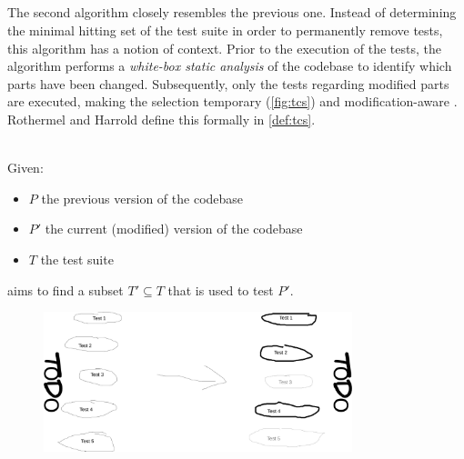 
\subsection{\tcs{}}
The second algorithm closely resembles the previous one. Instead of determining the minimal hitting set of the test suite in order to permanently remove tests, this algorithm has a notion of context. Prior to the execution of the tests, the algorithm performs a \emph{white-box static analysis} of the codebase to identify which parts have been changed. Subsequently, only the tests regarding modified parts are executed, making the selection temporary (\autoref{fig:tcs}) and modification-aware \cite{10.1002/stv.430}. Rothermel and Harrold define this formally in \autoref{def:tcs}.

\begin{definition}[\tcs{}]
\label{def:tcs}
\mbox{}\\Given:
\begin{itemize}
	\item $P$ the previous version of the codebase
	\item $P'$ the current (modified) version of the codebase
	\item $T$ the test suite
\end{itemize}

\noindent \tcs{} aims to find a subset $T' \subseteq T$ that is used to test $P'$. 
\end{definition}

\begin{figure}[htbp!]
	\centering
	\includegraphics[width=0.8\textwidth]{assets/images/approach-tcs.pdf}
	\caption{\tcs{}}
	\label{fig:tcs}
\end{figure}